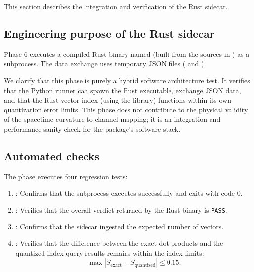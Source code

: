 
This section describes the integration and verification of the Rust sidecar.

\subsection{Engineering purpose of the Rust sidecar}
Phase 6 executes a compiled Rust binary named  (built from the sources in ) as a subprocess. The data exchange uses temporary JSON files ( and ).

We clarify that this phase is purely a hybrid software architecture test. It verifies that the Python runner can spawn the Rust executable, exchange JSON data, and that the Rust vector index (using the  library) functions within its own quantization error limits. This phase does not contribute to the physical validity of the spacetime curvature-to-channel mapping; it is an integration and performance sanity check for the package's software stack.

\subsection{Automated checks}
The phase executes four regression tests:
\begin{enumerate}
  \item {}: Confirms that the subprocess executes successfully and exits with code $0$.
  \item {}: Verifies that the overall verdict returned by the Rust binary is \texttt{PASS}.
  \item {}: Confirms that the sidecar ingested the expected number of vectors.
  \item {}: Verifies that the difference between the exact dot products and the quantized index query results remains within the index limits:
        \begin{equation}
          \max |S_{\text{exact}} - S_{\text{quantized}}| \le 0.15.
          \label{eq:quantization_error}
        \end{equation}
\end{enumerate}
